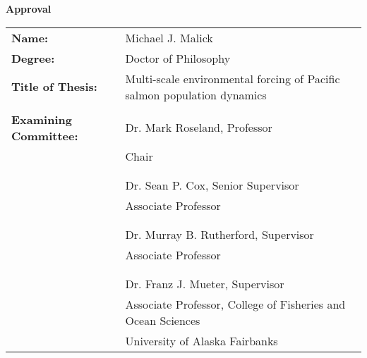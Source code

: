 

\begin{center}
{ \large \textbf{Approval} }
\end{center}

\vspace{4mm}

\hspace*{-1cm} \begin{tabular}{ l p{94mm} }
  \textbf{Name:} & Michael J. Malick \\
  \textbf{Degree:} & Doctor of Philosophy \\
  \textbf{Title of Thesis:} & Multi-scale environmental forcing of Pacific
  salmon population dynamics \\

  & \\

  \textbf{Examining Committee:} & Dr. Mark Roseland, Professor \\
                                & Chair \\

    & \\

    & \\ \cline{2-2}
    & Dr. Sean P. Cox, Senior Supervisor \\
    & Associate Professor \\

    & \\

    & \\ \cline{2-2}
    & Dr. Murray B. Rutherford, Supervisor \\
    & Associate Professor \\

    & \\

    & \\ \cline{2-2}
    & Dr. Franz J. Mueter, Supervisor \\
    & Associate Professor, College of Fisheries and Ocean Sciences\\
    & University of Alaska Fairbanks\\


\end{tabular}
